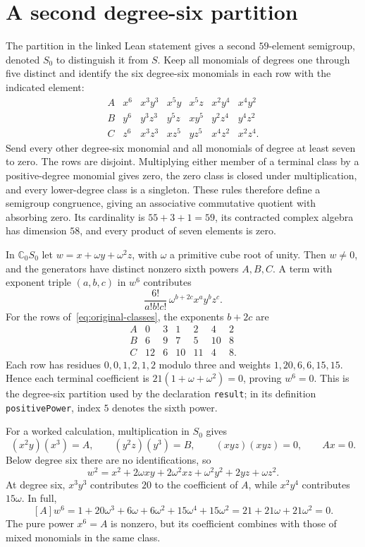 \documentclass[11pt]{article}
\newcommand{\C}{\mathbb C}
\begin{document}
\appendix
\section{A second degree-six partition}\label{app:partition}
The partition in the linked Lean statement gives a second $59$-element
semigroup, denoted $S_0$ to distinguish it from $S$.
Keep all monomials of degrees one through five distinct and identify the
six degree-six monomials in each row with the indicated element:
\begin{equation}\label{eq:original-classes}
\begin{array}{c|llllll}
A&x^6&x^3y^3&x^5y&x^5z&x^2y^4&x^4y^2\\[2pt]
B&y^6&y^3z^3&y^5z&xy^5&y^2z^4&y^4z^2\\[2pt]
C&z^6&x^3z^3&xz^5&yz^5&x^4z^2&x^2z^4.
\end{array}
\end{equation}
Send every other degree-six monomial and all monomials of degree at
least seven to zero. The rows are disjoint. Multiplying either member
of a terminal class by a positive-degree monomial gives zero, the zero
class is closed under multiplication, and every lower-degree class is a
singleton. These rules therefore define a semigroup congruence, giving
an associative commutative quotient with absorbing zero. Its cardinality
is $55+3+1=59$, its contracted complex algebra has dimension $58$, and
every product of seven elements is zero.

In $\C_0S_0$ let $w=x+\omega y+\omega^2z$, with $\omega$ a primitive
cube root of unity. Then $w\ne0$, and the generators have distinct
nonzero sixth powers $A,B,C$. A term with exponent triple $(a,b,c)$ in
$w^6$ contributes
\[
\frac{6!}{a!b!c!}\,\omega^{b+2c}x^ay^bz^c.
\]
For the rows of~\eqref{eq:original-classes}, the exponents $b+2c$ are
\[
\begin{array}{c|rrrrrr}
A&0&3&1&2&4&2\\
B&6&9&7&5&10&8\\
C&12&6&10&11&4&8.
\end{array}
\]
Each row has residues $0,0,1,2,1,2$ modulo three and weights
$1,20,6,6,15,15$. Hence each terminal coefficient is
$21(1+\omega+\omega^2)=0$, proving $w^6=0$.
This is the degree-six partition used by the declaration \texttt{result};
in its definition \texttt{positivePower}, index $5$ denotes the sixth power.

For a worked calculation, multiplication in $S_0$ gives
\[
(x^2y)(x^3)=A,\qquad (y^2z)(y^3)=B,\qquad
(xyz)(xyz)=0,\qquad Ax=0.
\]
Below degree six there are no identifications, so
\[
w^2=x^2+2\omega xy+2\omega^2xz+\omega^2y^2+2yz+\omega z^2.
\]
At degree six, $x^3y^3$ contributes $20$ to the coefficient of $A$,
while $x^2y^4$ contributes $15\omega$. In full,
\[
[A]w^6=1+20\omega^3+6\omega+6\omega^2+15\omega^4+15\omega^2
=21+21\omega+21\omega^2=0.
\]
The pure power $x^6=A$ is nonzero, but its coefficient combines with
those of mixed monomials in the same class.
\end{document}
